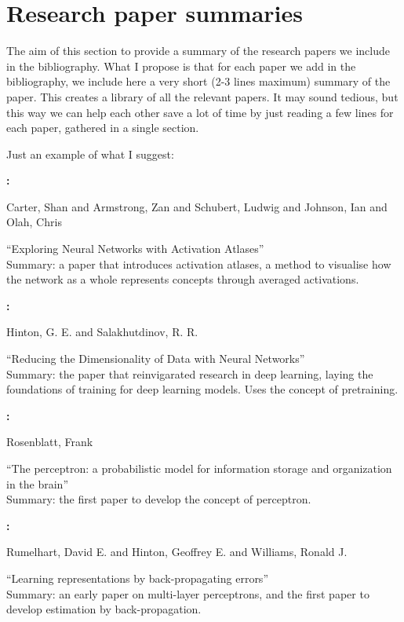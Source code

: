 \section{Research paper summaries}
\label{sec5}


The aim of this section to provide a summary of the research papers we include in the bibliography. What I propose is that for each paper we add in the bibliography, we include here a very short (2-3 lines maximum) summary of the paper. This creates a library of all the relevant papers. It may sound tedious, but this way we can help each other save a lot of time by just reading a few lines for each paper, gathered in a single section. 


Just an example of what I suggest:


\textbf{\cite{Carter2019}:}

Carter, Shan and Armstrong, Zan and Schubert, Ludwig and Johnson, Ian and Olah, Chris

``Exploring Neural Networks with Activation Atlases''\\
Summary: a paper that introduces activation atlases, a method to visualise how the network as a whole represents concepts through averaged activations.
 


\textbf{\cite{Hinton2006}:}

Hinton, G. E. and Salakhutdinov, R. R.

``Reducing the Dimensionality of Data with Neural Networks''\\
Summary: the paper that reinvigarated research in deep learning, laying the foundations of training for deep learning models. Uses the concept of pretraining.
 


\textbf{\cite{Rosenblatt1958}:}

Rosenblatt, Frank

``The perceptron: a probabilistic model for information storage and organization in the brain''\\
Summary: the first paper to develop the concept of perceptron.
 


\textbf{\cite{Rumelhart1986}:}

Rumelhart, David E. and Hinton, Geoffrey E. and Williams, Ronald J.

``Learning representations by back-propagating errors''\\
Summary: an early paper on multi-layer perceptrons, and the first paper to develop estimation by back-propagation.
 


